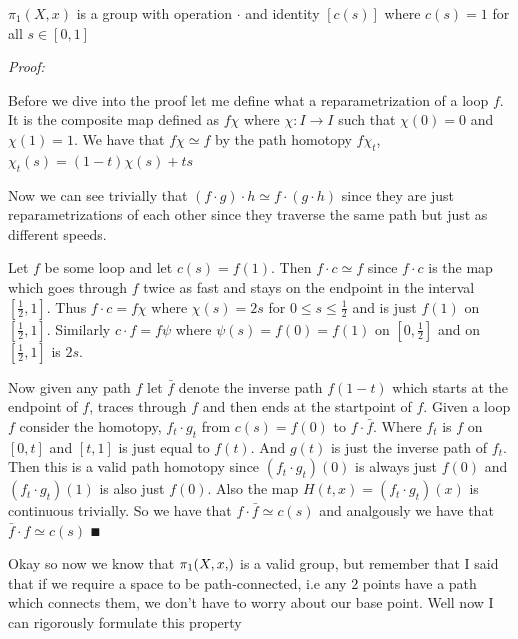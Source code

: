 \documentclass[paper=a4,fontsize=paper,12.5pt]{book}
\newcommand{\3}{\vspace*{3mm}}
\newcommand{\Proof}{\textit{Proof:}}
\newcommand{\Fund}[2]{{\pi}_{1}(#1,#2)}
\begin{document}
\3

\begin{lemma}

 $\Fund{X}{x}$ is a group with operation $\cdot$ and identity $[c(s)]$ where $c(s) = 1$ for all $s \in [0,1]$


\end{lemma}

\Proof

Before we dive into the proof let me define what a reparametrization of a loop $f$. It is the composite map defined as $f\chi$ where $\chi: I \to I$ such that $\chi(0) = 0$ and $\chi(1) =1$. We have that $f\chi \simeq f$ by the path homotopy $f{\chi}_{t}$, ${\chi}_{t}(s) = (1-t)\chi(s) + ts$

\3

Now we can see trivially that $(f \cdot g) \cdot h \simeq f \cdot (g \cdot h)$ since they are just reparametrizations of each other since they traverse the same path but just as different speeds. 

\3

Let $f$ be some loop and let $c(s) = f(1)$. Then $f \cdot c \simeq f$ since $f\cdot c$ is the map which goes through $f$ twice as fast and stays on the endpoint in the interval $[\frac{1}{2},1]$. Thus $f \cdot c = f\chi$ where $\chi(s) = 2s$ for $0 \leq s \leq \frac{1}{2}$ and is just $f(1)$ on $[\frac{1}{2},1]$. Similarly $c \cdot f = f\psi$ where $\psi(s) = f(0) = f(1)$ on $[0,\frac{1}{2}]$ and on $[\frac{1}{2},1]$ is $2s$.

\3

Now given any path $f$ let $\bar{f}$ denote the inverse path $f(1-t)$ which starts at the endpoint of $f$, traces through $f$ and then ends at the startpoint of $f$. Given a loop $f$ consider the homotopy, ${f}_{t} \cdot {g}_{t}$ from $c(s) = f(0)$ to $f \cdot \bar{f}$. Where ${f}_{t}$ is $f$ on $[0,t]$ and $[t,1]$ is just equal to $f(t)$. And $g(t)$ is just the inverse path of ${f}_{t}$. Then this is a valid path homotopy since $({f}_{t} \cdot {g}_{t})(0)$ is always just $f(0)$ and $({f}_{t} \cdot {g}_{t})(1)$ is also just $f(0)$. Also the map $H(t,x) = ({f}_{t} \cdot {g}_{t})(x)$ is continuous trivially. So we have that $f \cdot \bar{f} \simeq c(s)$ and analgously we have that $\bar{f} \cdot f \simeq c(s)$ $\QED$

\3

Okay so now we know that $\Fund{X,x}$ is a valid group, but remember that I said that if we require a space to be path-connected, i.e any $2$ points have a path which connects them, we don't have to worry about our base point. Well now I can rigorously formulate this property
\end{document}
